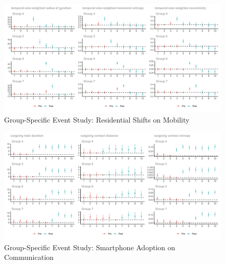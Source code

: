 \clearpage\newpage
\begin{figure}[ht!]
\centering
\caption{Group-Specific Event Study: Residential Shifts on Mobility}


\includegraphics[width=1.5\textwidth, angle=90]{figures/csdid/cohort_specific_ATT_dynamics/residential_shift_mobility.png}

\label{fig:attgt_residential_shift_mobility}
\end{figure}


\clearpage\newpage
\begin{figure}[ht!]
\centering
\caption{Group-Specific Event Study: Smartphone Adoption on Communication}


\includegraphics[width=1.5\textwidth, angle=90]{figures/csdid/cohort_specific_ATT_dynamics/smartphone_adoption_mobile_communication_network.png}

\label{fig:attgt_smartphone_adoption_mobile_communication_network}
\end{figure}



